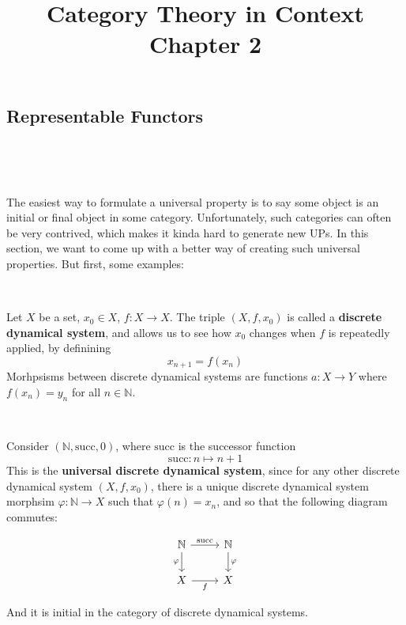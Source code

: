 \documentclass{article}
\title{Category Theory in Context Chapter 2}
\begin{document}
\maketitle

\setcounter{section}{2}
\subsection{Representable Functors}
\

\begin{remark}
	\

	The easiest way to formulate a universal property is to say some object is an initial or final object in some category. Unfortunately, such categories can often be very contrived, which makes it kinda hard to generate new UPs. In this section, we want to come up with a better way of creating such universal properties. But first, some examples:
\end{remark}

\begin{definition}
	\

	Let $X$ be a set, $x_0 \in X$, $f: X \to X$. The triple $(X, f, x_0)$ is called a \textbf{discrete dynamical system}, and allows us to see how $x_0$ changes when $f$ is repeatedly applied, by definining $$x_{n+1} = f(x_n)$$Morhpsisms between discrete dynamical systems are functions $a: X \to Y$ where $f(x_n) = y_n$ for all $n \in \mathbb{N}$.
\end{definition}

\begin{proposition}
	\

	Consider $(\mathbb{N}, \text{succ}, 0)$, where $\text{succ}$ is the successor function $$\text{succ}: n \mapsto n+1$$This is the \textbf{universal discrete dynamical system}, since for any other discrete dynamical system $(X, f, x_0)$, there is a unique discrete dynamical system morphsim $\varphi: \mathbb{N} \to X$ such that $\varphi(n) = x_n$, and so that the following diagram commutes:

	\[\begin{tikzcd}
			\mathbb{N} & \mathbb{N}\\
			X & X
			\arrow[from=1-1, to=1-2, "\text{succ}"]
			\arrow[from=1-1, to=2-1, "\varphi"']
			\arrow[from=1-2, to=2-2, "\varphi"]
			\arrow[from=2-1, to=2-2, "f"']
		\end{tikzcd}\]

	And it is initial in the category of discrete dynamical systems.
\end{proposition}
\end{document}

